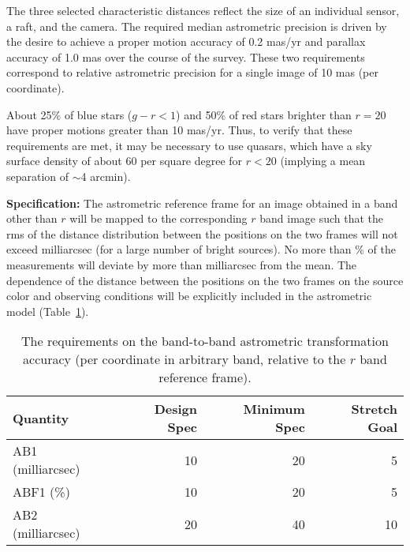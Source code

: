 The three selected characteristic distances reflect the size of an
individual sensor, a
raft, and the camera. The required median astrometric precision is driven by
the desire to achieve a proper motion accuracy of 0.2 mas/yr and parallax
accuracy of 1.0 mas over the course of the survey. These two requirements
correspond to relative astrometric precision for a single image of 10 mas
(per coordinate).

About 25\% of blue stars ($g-r<1$) and 50\% of
red stars brighter than $r=20$ have proper motions greater than 10
mas/yr. Thus, to verify that these requirements are met, it may be
necessary to use quasars, which have a sky surface density of about 60 per
square degree for $r<20$ (implying a mean separation of $\sim$4 arcmin).

{\bf Specification:} The astrometric reference frame for an image obtained
in a band other than $r$ will be mapped to the corresponding $r$ band image
such that the rms of the distance distribution between the positions on the
two frames will not exceed
milliarcsec (for a large number of bright sources). No more than
\% of the measurements will deviate by more than
milliarcsec from the mean. The dependence of the distance between the
positions on the two frames on the source color and observing
conditions will be explicitly included in the astrometric model
(Table~\ref{Tastrob2b}).

\begin{table}[h]
\begin{tabular}{|l|r|r|r|}
\hline
Quantity   & Design Spec & Minimum Spec & Stretch Goal     \\
\hline
    AB1 (milliarcsec)  &    10      &        20    &        5         \\
    ABF1 (\%)          &    10      &        20    &        5         \\
    AB2 (milliarcsec)  &    20      &        40   &        10         \\
\hline

\end{tabular}
\caption{The requirements on the band-to-band astrometric transformation
accuracy (per coordinate in arbitrary band, relative to the $r$ band reference frame).}
\label{Tastrob2b}
\end{table}


